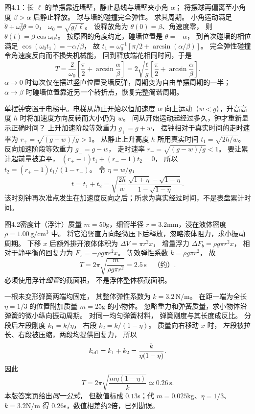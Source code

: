 图4.1：长 $\ell$ 的单摆靠近墙壁，静止悬线与墙壁夹小角 $\alpha$；
将摆球再偏离至小角度 $\beta>\alpha$ 后静止释放。
球与墙的碰撞完全弹性。
求其周期。
\exsolution
小角运动满足
$\ddot\theta+\omega_0^2\theta=0$，
$\omega_0=\sqrt{g/\ell}$。
设释放角为 $\theta(0)=\beta$、角速度零，
则
$\theta(t)=\beta\cos\omega_0t$。
按原图的角度约定，碰墙位置是
$\theta=-\alpha$，
到首次碰墙的相位满足
$\cos(\omega_0t_1)=-\alpha/\beta$，
故
$t_1=\omega_0^{-1}[\pi/2+\arcsin(\alpha/\beta)]$。
完全弹性碰撞令角速度反向而不损失机械能，
回到释放端花相同时间，于是
\[
\boxed{T=\frac2{\omega_0}
\left[\frac\pi2+\arcsin\frac\alpha\beta\right]
=2\sqrt{\frac\ell g}
\left[\frac\pi2+\arcsin\frac\alpha\beta\right]}.
\]
\excheck $\alpha\to0$ 时每次仅在摆过竖直位置受墙反弹，周期变为自由单摆周期的一半；
$\alpha\to\beta$ 时碰墙位置靠近另一个转折点，恢复完整简谐周期。

单摆钟安置于电梯中。电梯从静止开始以恒加速度
$w$ 向上运动（$w<g$），升高高度 $h$ 时将加速度方向反转而大小仍为 $w$。
问从开始运动起经过多久，钟才重新显示正确时间？
\exsolution
上升加速阶段等效重力
$g_+=g+w$，
摆钟相对于真实时间的走时速率为
$r_+=\sqrt{(g+w)/g}>1$。
从静止上升高度 $h$ 所用真实时间
$t_1=\sqrt{2h/w}$。
反向加速阶段等效重力
$g_-=g-w$，
走时速率
$r_-=\sqrt{(g-w)/g}<1$。
要让累计超前量被追平，
$(r_+-1)t_1+(r_--1)t_2=0$，
所以
$t_2=(r_+-1)t_1/(1-r_-)$。
令 $\eta=w/g$，
\[
\boxed{t=t_1+t_2=
\sqrt{\frac{2h}{w}}\,
\frac{\sqrt{1+\eta}-\sqrt{1-\eta}}
{1-\sqrt{1-\eta}}}.
\]
\excheck 该时刻钟再次准点发生在加速度反向之后；所求为真实经过时间，不是表盘累计时间。

图4.2密度计（浮计）质量
$m=50$g，细管半径
$r=3.2$mm，浸在液体密度
$\rho=1.00\,\mathrm{g/cm^3}$ 中。
将它沿竖直方向轻微压下后释放，忽略液体阻力，求小振动周期。
\exsolution
下移 $x$ 后额外排开液体体积为
$\Delta V=\pi r^2x$，
增量浮力
$\Delta F_b=\rho g\pi r^2x$，
相对于静平衡的回复力为
$F_x=-\rho g\pi r^2x$。
等效弹性系数
$k=\rho g\pi r^2$，
故
\[
\boxed{T=2\pi\sqrt{\frac{m}{\rho g\pi r^2}}}
=\boxed{2.5\,\mathrm s}\quad\text{（约）}.
\]
\excheck 必须使用浮计\emph{细管}的截面积，
不是浮体整体横截面积。

一根未变形弹簧两端均固定，
其整体弹性系数为
$k=3.2\,\mathrm{N/m}$。
在距一端为全长
$\eta=1/3$ 的位置附加质量
$m=25$g 的小物体。
忽略重力和弹簧质量，求小物体沿弹簧的微小纵向振动周期。
\exsolution
对同一均匀弹簧材料，
弹簧刚度与其长度成反比。
分段后左段刚度
$k_1=k/\eta$，
右段
$k_2=k/(1-\eta)$。
质量向右移动 $x$ 时，
左段被拉长、右段被压缩，两段均提供回复力，
所以
\[
k_{\rm eff}=k_1+k_2
=\frac{k}{\eta(1-\eta)}.
\]
因此
\[
\boxed{T=2\pi\sqrt{\frac{m\eta(1-\eta)}{k}}
\simeq0.26\,\mathrm s}.
\]
\excheck 本版答案页给出\emph{同一公式}，
但数值标成 $0.13$s；代
$m=0.025$kg、$\eta=1/3$、$k=3.2$N/m
得 $0.26$s，数值相差约2倍，已列勘误。

